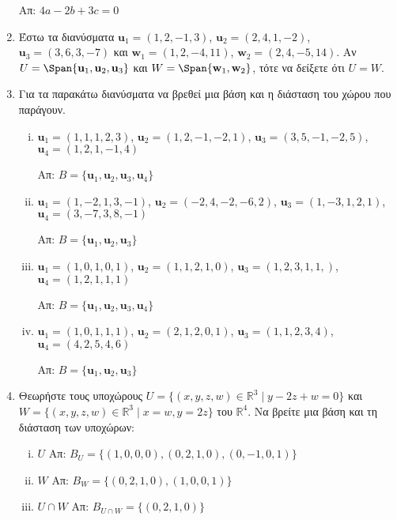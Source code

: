 \begin{enumerate}
		\hfill Απ: $ 4a -2b + 3c = 0 $ 


	\item Έστω τα διανύσματα $ \mathbf{u}_{1} = (1,2,-1,3)$, $\mathbf{u}_{2} = (2,4,1,-2)$, $ \mathbf{u} _{3} = (3,6,3,-7) $ και $ \mathbf{w}_{1} = (1,2,-4,11)$, $ \mathbf{w}_{2} = (2,4,-5,14) $. Αν $
		U = \Span \{ \mathbf{u}_{1}, \mathbf{u}_{2}, \mathbf{u}_{3} \} $ και $ W = \Span \{
		\mathbf{w}_{1}, \mathbf{w}_{2} \} $, τότε να δείξετε ότι $ U=W $.

	\item Για τα παρακάτω διανύσματα να βρεθεί μια βάση και η διάσταση του χώρου που παράγουν.
		\begin{enumerate}[(i)]
			\item $ \mathbf{u}_{1} = (1,1,1,2,3) $, $ \mathbf{u}_{2} = (1,2,-1,-2,1) $, $ \mathbf{u}
				_{3} = (3,5,-1,-2,5) $, $ \mathbf{u}_{4} = (1,2,1,-1,4) $

				\hfill Απ: $ B = \{ \mathbf{u}_{1}, \mathbf{u}_{2}, \mathbf{u}_{3}, \mathbf{u}_{4} \} $ 
			\item $ \mathbf{u}_{1} = (1,-2,1,3,-1) $, $ \mathbf{u}_{2} = (-2,4,-2,-6,2) $, $
				\mathbf{u}_{3} = (1,-3,1,2,1) $, $ \mathbf{u}_{4} = (3,-7,3,8,-1) $

				\hfill Απ: $ B = \{ \mathbf{u}_{1}, \mathbf{u}_{2}, \mathbf{u}_{3} \} $ 

			\item $ \mathbf{u}_{1} = (1,0,1,0,1) $, $ \mathbf{u}_{2} = (1,1,2,1,0) $, $ \mathbf{u}
				_{3} = (1,2,3,1,1,) $, $ \mathbf{u}_{4} = (1,2,1,1,1) $

				\hfill Απ: $ B = \{ \mathbf{u}_{1}, \mathbf{u}_{2}, \mathbf{u}_{3}, \mathbf{u}_{4} \} $ 
			\item $ \mathbf{u}_{1} = (1,0,1,1,1) $, $ \mathbf{u}_{2} = (2,1,2,0,1) $, $ \mathbf{u}
				_{3} = (1,1,2,3,4) $, $ \mathbf{u}_{4} = (4,2,5,4,6) $

				\hfill Απ: $ B = \{ \mathbf{u}_{1}, \mathbf{u}_{2}, \mathbf{u}_{3} \} $ 
		\end{enumerate}

	\item Θεωρήστε τους υποχώρους $ U = \{ (x,y,z,w) \in \mathbb{R}^{3} \mid y - 2z + w = 0 \} $ και
    $ W = \{ (x,y,z,w) \in \mathbb{R}^{3} \mid x = w, y = 2z \} $ του $\mathbb{R}^{4}$. Να
		βρείτε μια βάση και τη διάσταση των υποχώρων:
		\begin{enumerate}[(i)]
            \item $ U $ \hfill Απ: $ B_{U} = \{ (1,0,0,0), (0,2,1,0), (0,-1,0,1) \} $ 
            \item $ W $ \hfill Απ: $ B_{W} = \{ (0,2,1,0), (1,0,0,1) \} $ 
            \item $ U \cap W $ \hfill Απ: $ B_{U\cap W} = \{ (0,2,1,0) \} $ 
		\end{enumerate}	


\end{enumerate}
